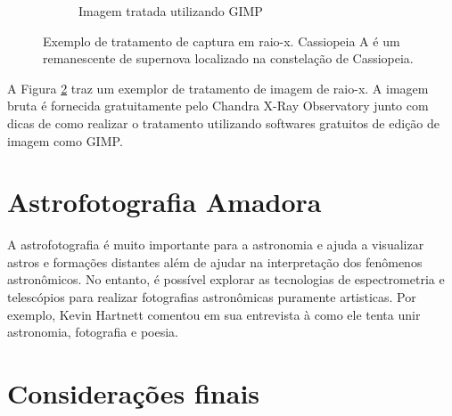 \documentclass[
	article,			%
	12pt,				%
	oneside,			%
	a4paper,			%
	english,			%
	brazil,				%
	sumario=tradicional
	]{abntex2}
\begin{document}
\begin{figure}
\begin{subfigure}[hb]{0.45\textwidth}
        \caption{Imagem tratada utilizando GIMP}
        \label{fig:colorspace}
	\end{subfigure}
    \caption{Exemplo de tratamento de captura em raio-x. Cassiopeia A é um remanescente de supernova localizado na constelação de Cassiopeia.}\label{fig:example}
\end{figure}

A Figura \ref{fig:example} traz um exemplor de tratamento de imagem de raio-x.
A imagem bruta é fornecida gratuitamente pelo Chandra X-Ray Observatory junto
com dicas de como realizar o tratamento utilizando softwares gratuitos de edição
de imagem como GIMP. \cite{openfits}

\section{Astrofotografia Amadora}

A astrofotografia é muito importante para a astronomia e ajuda a visualizar
astros e formações distantes além de ajudar na interpretação dos fenômenos
astronômicos. No entanto, é possível explorar as tecnologias de espectrometria
e telescópios para realizar fotografias astronômicas puramente artisticas. Por
exemplo, Kevin Hartnett comentou em sua entrevista à
 como ele tenta unir astronomia, fotografia e
poesia.

% 

\section{Considerações finais}

\lipsum[1]

\begin{citacao}
\lipsum[2]
\end{citacao}

\lipsum[3]
\newpage
\postextual{}


\end{document}

